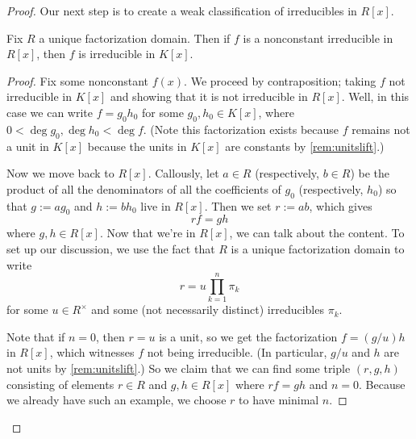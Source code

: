 \begin{proof}
	Our next step is to create a weak classification of irreducibles in $R[x]$.
	\begin{lemma} \label{lem:irredfracfield}
		Fix $R$ a unique factorization domain. Then if $f$ is a nonconstant irreducible in $R[x]$, then $f$ is irreducible in $K[x]$.
	\end{lemma}
	\begin{proof}
		Fix some nonconstant $f(x)$. We proceed by contraposition; taking $f$ not irreducible in $K[x]$ and showing that it is not irreducible in $R[x]$. Well, in this case we can write $f=g_0h_0$ for some $g_0,h_0\in K[x]$, where $0<\deg g_0,\deg h_0<\deg f$. (Note this factorization exists because $f$ remains not a unit in $K[x]$ because the units in $K[x]$ are constants by \autoref{rem:unitslift}.)
		
		Now we move back to $R[x]$. Callously, let $a\in R$ (respectively, $b\in R$) be the product of all the denominators of all the coefficients of $g_0$ (respectively, $h_0$) so that $g:=ag_0$ and $h:=bh_0$ live in $R[x]$. Then we set $r:=ab$, which gives
		\[rf=gh\]
		where $g,h\in R[x]$. Now that we're in $R[x]$, we can talk about the content. To set up our discussion, we use the fact that $R$ is a unique factorization domain to write
		\[r=u\prod_{k=1}^n\pi_k\]
		for some $u\in R^\times$ and some (not necessarily distinct) irreducibles $\pi_k$.

		Note that if $n=0$, then $r=u$ is a unit, so we get the factorization $f=(g/u)h$ in $R[x]$, which witnesses $f$ not being irreducible. (In particular, $g/u$ and $h$ are not units by \autoref{rem:unitslift}.) So we claim that we can find some triple $(r,g,h)$ consisting of elements $r\in R$ and $g,h\in R[x]$ where $rf=gh$ and $n=0$. Because we already have such an example, we choose $r$ to have minimal $n$.


\end{proof}
\end{proof}
